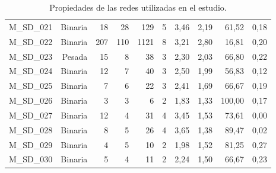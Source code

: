 \begin{table}[ht!]
\begin{tabular}{lrrrrrrrrr}
    M\_SD\_021 & Binaria & 18   & 28   & 129  & 5    & 3,46 & 2,19 & 61,52 & 0,18 \\
    M\_SD\_022 & Binaria & 207  & 110  & 1121 & 8    & 3,21 & 2,80 & 16,81 & 0,20 \\
    M\_SD\_023 & Pesada & 15   & 8    & 38   & 3    & 2,30 & 2,03 & 66,80 & 0,22 \\
    M\_SD\_024 & Binaria & 12   & 7    & 40   & 3    & 2,50 & 1,99 & 56,83 & 0,12 \\
    M\_SD\_025 & Binaria & 7    & 6    & 22   & 3    & 2,41 & 1,69 & 66,67 & 0,19 \\
    M\_SD\_026 & Binaria & 3    & 3    & 6    & 2    & 1,83 & 1,33 & 100,00 & 0,17 \\
    M\_SD\_027 & Binaria & 12   & 4    & 31   & 4    & 3,45 & 1,53 & 73,61 & 0,00 \\
    M\_SD\_028 & Binaria & 8    & 5    & 26   & 4    & 3,65 & 1,38 & 89,47 & 0,02 \\
    M\_SD\_029 & Binaria & 4    & 5    & 10   & 2    & 1,98 & 1,52 & 81,25 & 0,27 \\
    M\_SD\_030 & Binaria & 5    & 4    & 11   & 2    & 2,24 & 1,50 & 66,67 & 0,23 \\
    \bottomrule
    \end{tabular}%
    \caption{\label{table:table_results} Propiedades de las redes utilizadas en el estudio.}
\end{table}%

\clearpage
